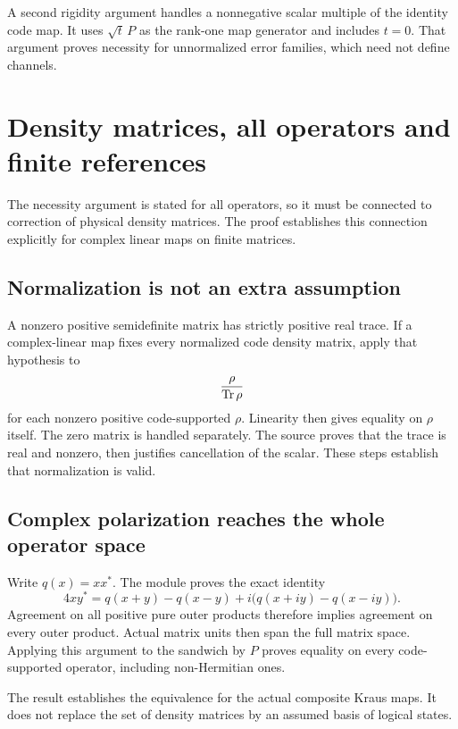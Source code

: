 A second rigidity argument handles a nonnegative scalar multiple of the identity code map. It uses $\sqrt t\,P$ as the rank-one map generator and includes $t=0$. That argument proves necessity for unnormalized error families, which need not define channels.



\section{Density matrices, all operators and finite references}\label{supp5:section:004}
The necessity argument is stated for all operators, so it must be connected to correction of physical density matrices. The proof establishes this connection explicitly for complex linear maps on finite matrices.

\subsection{Normalization is not an extra assumption}
A nonzero positive semidefinite matrix has strictly positive real trace. If a complex-linear map fixes every normalized code density matrix, apply that hypothesis to
\[
\frac{\rho}{\operatorname{Tr}\rho}
\]
for each nonzero positive code-supported $\rho$. Linearity then gives equality on $\rho$ itself. The zero matrix is handled separately. The source proves that the trace is real and nonzero, then justifies cancellation of the scalar. These steps establish that normalization is valid.

\subsection{Complex polarization reaches the whole operator space}
Write $q(x)=xx^*$. The module proves the exact identity
\[
4xy^*=q(x+y)-q(x-y)
+i\bigl(q(x+iy)-q(x-iy)\bigr).
\]
Agreement on all positive pure outer products therefore implies agreement on every outer product. Actual matrix units then span the full matrix space. Applying this argument to the sandwich by $P$ proves equality on every code-supported operator, including non-Hermitian ones.

The result  establishes the equivalence for the actual composite Kraus maps. It does not replace the set of density matrices by an assumed basis of logical states.

